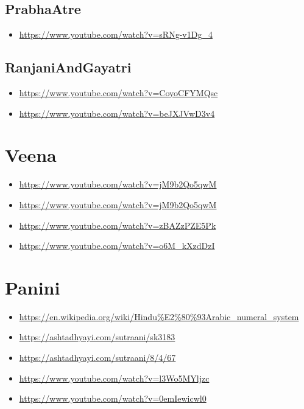 \subsection{PrabhaAtre}
\label{sec:orgd985440}
\begin{itemize}
\item \url{https://www.youtube.com/watch?v=sRNg-v1Dg\_4}
\end{itemize}

\subsection{RanjaniAndGayatri}
\label{sec:org6c57126}
\begin{itemize}
\item \url{https://www.youtube.com/watch?v=CoyoCFYMQsc}
\item \url{https://www.youtube.com/watch?v=beJXJVwD3v4}
\end{itemize}

\section{Veena}
\label{sec:orga74f21a}
\begin{itemize}
\item \url{https://www.youtube.com/watch?v=jM9b2Qo5qwM}
\item \url{https://www.youtube.com/watch?v=jM9b2Qo5qwM}
\item \url{https://www.youtube.com/watch?v=zBAZzPZE5Pk}
\item \url{https://www.youtube.com/watch?v=o6M\_kXzdDzI}
\end{itemize}

\section{Panini}
\label{sec:org118ac0e}
\begin{itemize}
\item \url{https://en.wikipedia.org/wiki/Hindu\%E2\%80\%93Arabic\_numeral\_system}
\item \url{https://ashtadhyayi.com/sutraani/sk3183}
\item \url{https://ashtadhyayi.com/sutraani/8/4/67}
\item \url{https://www.youtube.com/watch?v=l3Wo5MYljzc}
\item \url{https://www.youtube.com/watch?v=0emIewicwl0}
\end{itemize}




